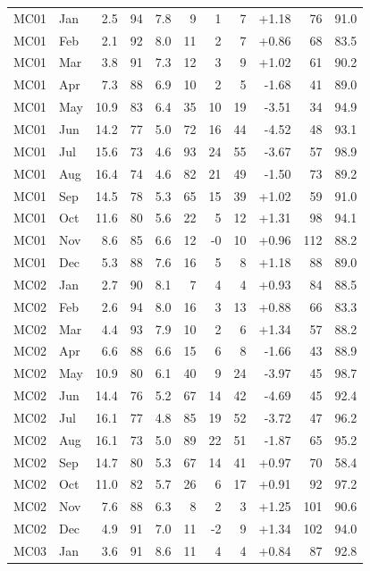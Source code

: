 \begin{longtable}{llrrrrrrrrr}
MC01 & Jan & 2.5 & 94 & 7.8 & 9 & 1 & 7 & +1.18 & 76 & 91.0 \\
MC01 & Feb & 2.1 & 92 & 8.0 & 11 & 2 & 7 & +0.86 & 68 & 83.5 \\
MC01 & Mar & 3.8 & 91 & 7.3 & 12 & 3 & 9 & +1.02 & 61 & 90.2 \\
MC01 & Apr & 7.3 & 88 & 6.9 & 10 & 2 & 5 & -1.68 & 41 & 89.0 \\
MC01 & May & 10.9 & 83 & 6.4 & 35 & 10 & 19 & -3.51 & 34 & 94.9 \\
MC01 & Jun & 14.2 & 77 & 5.0 & 72 & 16 & 44 & -4.52 & 48 & 93.1 \\
MC01 & Jul & 15.6 & 73 & 4.6 & 93 & 24 & 55 & -3.67 & 57 & 98.9 \\
MC01 & Aug & 16.4 & 74 & 4.6 & 82 & 21 & 49 & -1.50 & 73 & 89.2 \\
MC01 & Sep & 14.5 & 78 & 5.3 & 65 & 15 & 39 & +1.02 & 59 & 91.0 \\
MC01 & Oct & 11.6 & 80 & 5.6 & 22 & 5 & 12 & +1.31 & 98 & 94.1 \\
MC01 & Nov & 8.6 & 85 & 6.6 & 12 & -0 & 10 & +0.96 & 112 & 88.2 \\
MC01 & Dec & 5.3 & 88 & 7.6 & 16 & 5 & 8 & +1.18 & 88 & 89.0 \\
\midrule
MC02 & Jan & 2.7 & 90 & 8.1 & 7 & 4 & 4 & +0.93 & 84 & 88.5 \\
MC02 & Feb & 2.6 & 94 & 8.0 & 16 & 3 & 13 & +0.88 & 66 & 83.3 \\
MC02 & Mar & 4.4 & 93 & 7.9 & 10 & 2 & 6 & +1.34 & 57 & 88.2 \\
MC02 & Apr & 6.6 & 88 & 6.6 & 15 & 6 & 8 & -1.66 & 43 & 88.9 \\
MC02 & May & 10.9 & 80 & 6.1 & 40 & 9 & 24 & -3.97 & 45 & 98.7 \\
MC02 & Jun & 14.4 & 76 & 5.2 & 67 & 14 & 42 & -4.69 & 45 & 92.4 \\
MC02 & Jul & 16.1 & 77 & 4.8 & 85 & 19 & 52 & -3.72 & 47 & 96.2 \\
MC02 & Aug & 16.1 & 73 & 5.0 & 89 & 22 & 51 & -1.87 & 65 & 95.2 \\
MC02 & Sep & 14.7 & 80 & 5.3 & 67 & 14 & 41 & +0.97 & 70 & 58.4 \\
MC02 & Oct & 11.0 & 82 & 5.7 & 26 & 6 & 17 & +0.91 & 92 & 97.2 \\
MC02 & Nov & 7.6 & 88 & 6.3 & 8 & 2 & 3 & +1.25 & 101 & 90.6 \\
MC02 & Dec & 4.9 & 91 & 7.0 & 11 & -2 & 9 & +1.34 & 102 & 94.0 \\
\midrule
MC03 & Jan & 3.6 & 91 & 8.6 & 11 & 4 & 4 & +0.84 & 87 & 92.8 \\

\end{longtable}
